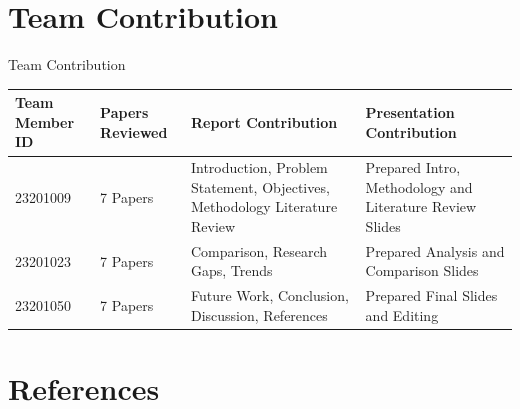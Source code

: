 \documentclass[11pt,aspectratio=169]{beamer}
\begin{document}
\section{Team Contribution}

\begin{frame}{Team Contribution}
\vspace{0.3cm}

\small

\begin{table}

\centering

\renewcommand{\arraystretch}{1.2}

\begin{tabular}{|m{1.5cm}|m{1.5cm}|m{3.5cm}|m{3.5cm}|}

\hline

\rowcolor{medixPrimary}

\color{white}\textbf{Team Member ID} &
\color{white}\textbf{Papers Reviewed} &
\color{white}\textbf{Report Contribution} &
\color{white}\textbf{Presentation Contribution}

\\

\hline

23201009 &
7 Papers &
Introduction, Problem Statement, Objectives, Methodology Literature Review &
Prepared Intro, Methodology and Literature Review Slides

\\

\hline

23201023 &
7 Papers &
Comparison, Research Gaps, Trends &
Prepared Analysis and Comparison Slides

\\

\hline

23201050 &
7 Papers &
Future Work, Conclusion, Discussion, References &
Prepared Final Slides and Editing

\\

\hline

\end{tabular}

\end{table}

\end{frame}








\section{References}
\end{document}
